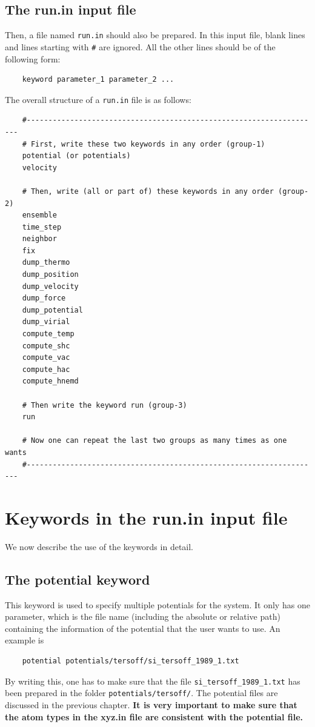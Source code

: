 \documentclass[12pt,a4paper]{report}
\begin{document}
\subsection{The run.in input file}

Then, a file named \verb"run.in" should also be prepared. In this input file, blank lines and lines starting with \verb"#" are ignored. All the other lines should be of the following form:
\begin{verbatim}
    keyword parameter_1 parameter_2 ...
\end{verbatim}
The overall structure of a \verb"run.in" file is as follows:
\begin{verbatim}
    #--------------------------------------------------------------------
    # First, write these two keywords in any order (group-1)
    potential (or potentials)
    velocity

    # Then, write (all or part of) these keywords in any order (group-2)
    ensemble
    time_step
    neighbor
    fix
    dump_thermo
    dump_position
    dump_velocity
    dump_force
    dump_potential
    dump_virial
    compute_temp
    compute_shc
    compute_vac
    compute_hac
    compute_hnemd

    # Then write the keyword run (group-3)
    run

    # Now one can repeat the last two groups as many times as one wants
    #--------------------------------------------------------------------
\end{verbatim}


\section{Keywords in the run.in input file}
We now describe the use of the keywords in detail.

\subsection{The potential keyword}

This keyword is used to specify multiple potentials for the system. It only has one parameter, which is the file name (including the absolute or relative path) containing the information of the potential that the user wants to use. An example is
\begin{verbatim}
    potential potentials/tersoff/si_tersoff_1989_1.txt
\end{verbatim}
By writing this, one has to make sure that the file \verb"si_tersoff_1989_1.txt" has been prepared in the folder \verb"potentials/tersoff/".
The potential files are discussed in the previous chapter. \textbf{It is very important to make sure that the atom types in the xyz.in file are consistent with the potential file.}
\end{document}
